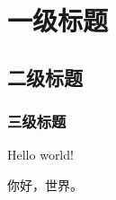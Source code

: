 \documentclass{article}
\begin{document}
    \tableofcontents
    \section{一级标题}
        \subsection{二级标题}
            \subsubsection{三级标题}
                Hello world!
        
                你好，世界。
\end{document}

